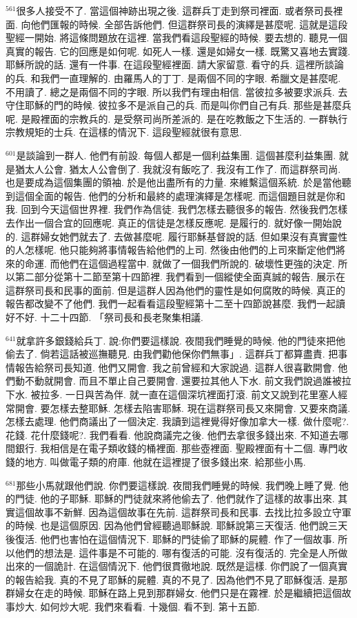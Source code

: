 \documentclass{book}
\begin{document}
$^{561}$很多人接受不了.
當這個神跡出現之後.
這群兵丁走到祭司裡面.
或者祭司長裡面.
向他們匯報的時候.
全部告訴他們.
但這群祭司長的演繹是甚麼呢.
這就是這段聖經一開始.
將這條問題放在這裡.
當我們看這段聖經的時候.
要去想的.
聽見一個真實的報告.
它的回應是如何呢.
如死人一樣.
還是如婦女一樣.
既驚又喜地去實踐.
耶穌所說的話.
還有一件事.
在這段聖經裡面.
請大家留意.
看守的兵.
這裡所談論的兵.
和我們一直理解的.
由羅馬人的丁丁.
是兩個不同的字眼.
希臘文是甚麼呢.
不用讀了.
總之是兩個不同的字眼.
所以我們有理由相信.
當彼拉多被要求派兵.
去守住耶穌的門的時候.
彼拉多不是派自己的兵.
而是叫你們自己有兵.
那些是甚麼兵呢.
是殿裡面的宗教兵的.
是受祭司尚所差派的.
是在吃教飯之下生活的.
一群執行宗教規矩的士兵.
在這樣的情況下.
這段聖經就很有意思.

$^{601}$是談論到一群人.
他們有前設.
每個人都是一個利益集團.
這個甚麼利益集團.
就是猶太人公會.
猶太人公會倒了.
我就沒有飯吃了.
我沒有工作了.
而這群祭司尚.
也是要成為這個集團的領袖.
於是他出盡所有的力量.
來維繫這個系統.
於是當他聽到這個全面的報告.
他們的分析和最終的處理演繹是怎樣呢.
而這個題目就是你和我.
回到今天這個世界裡.
我們作為信徒.
我們怎樣去聽很多的報告.
然後我們怎樣去作出一個合宜的回應呢.
真正的信徒是怎樣反應呢.
是履行的.
就好像一開始說的.
這群婦女她們就去了.
去做甚麼呢.
履行耶穌基督說的話.
但如果沒有真實靈性的人怎樣呢.
他只能夠將事情報告給他們的上司.
然後由他們的上司來斷定他們將來的命運.
而他們在這個過程當中.
就做了一個我們所說的.
破壞性更強的決定.
所以第二部分從第十二節至第十四節裡.
我們看到一個縱使全面真誠的報告.
展示在這群祭司長和民事的面前.
但是這群人因為他們的靈性是如何腐敗的時候.
真正的報告都改變不了他們.
我們一起看看這段聖經第十二至十四節說甚麼.
我們一起讀好不好.
十二十四節.
「祭司長和長老聚集相議.

$^{641}$就拿許多銀錢給兵丁.
說:你們要這樣說.
夜間我們睡覺的時候.
他的門徒來把他偷去了.
倘若這話被巡撫聽見.
由我們勸他保你們無事」.
這群兵丁都算盡責.
把事情報告給祭司長知道.
他們又開會.
我之前曾經和大家說過.
這群人很喜歡開會.
他們動不動就開會.
而且不單止自己要開會.
還要拉其他人下水.
前文我們說過誰被拉下水.
被拉多.
一日與苦為伴.
就一直在這個深坑裡面打滾.
前文又說到花里塞人經常開會.
要怎樣去整耶穌.
怎樣去陷害耶穌.
現在這群祭司長又來開會.
又要來商議.
怎樣去處理.
他們商議出了一個決定.
我讀到這裡覺得好像加拿大一樣.
做什麼呢?.
花錢.
花什麼錢呢?.
我們看看.
他說商議完之後.
他們去拿很多錢出來.
不知道去哪間銀行.
我相信是在電子類收錢的桶裡面.
那些壺裡面.
聖殿裡面有十二個.
專門收錢的地方.
叫做電子類的府庫.
他就在這裡提了很多錢出來.
給那些小馬.

$^{681}$那些小馬就跟他們說.
你們要這樣說.
夜間我們睡覺的時候.
我們晚上睡了覺.
他的門徒.
他的子耶穌.
耶穌的門徒就來將他偷去了.
他們就作了這樣的故事出來.
其實這個故事不新鮮.
因為這個故事在先前.
這群祭司長和民事.
去找比拉多設立守軍的時候.
也是這個原因.
因為他們曾經聽過耶穌說.
耶穌說第三天復活.
他們說三天後復活.
他們也害怕在這個情況下.
耶穌的門徒偷了耶穌的屍體.
作了一個故事.
所以他們的想法是.
這件事是不可能的.
哪有復活的可能.
沒有復活的.
完全是人所做出來的一個詭計.
在這個情況下.
他們很貫徹地說.
既然是這樣.
你們說了一個真實的報告給我.
真的不見了耶穌的屍體.
真的不見了.
因為他們不見了耶穌復活.
是那群婦女在走的時候.
耶穌在路上見到那群婦女.
他們只是在霧裡.
於是繼續把這個故事炒大.
如何炒大呢.
我們來看看.
十幾個.
看不到.
第十五節.
\end{document}

